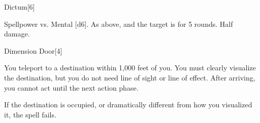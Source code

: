 \begin{spellsection}{Dictum}[6]
    \begin{spellheader}
    \end{spellheader}
    \begin{spellcontent}
        \begin{spelltargetinginfo}
        \end{spelltargetinginfo}
        \begin{spelleffects}
            \begin{spellattack}{Spellpower vs. Mental}
                \spellsuccess {}[d6].
                \spellcritical As above, and the target is \immobilized for 5 rounds.
                \spellfailure Half damage.
            \end{spellattack}
        \end{spelleffects}
    \end{spellcontent}
    \begin{spellfooter}
        \miscastexplode
    \end{spellfooter}
\end{spellsection}

\begin{spellsection}{Dimension Door}[4]
    \begin{spellheader}
    \end{spellheader}
    \begin{spellcontent}
        \begin{spelltargetinginfo}
        \end{spelltargetinginfo}
        \begin{spelleffects}
            \spelleffect You teleport to a destination within 1,000 feet of you. You must clearly visualize the destination, but you do not need line of sight or line of effect. After arriving, you cannot act until the next action phase.

            If the destination is occupied, or dramatically different from how you visualized it, the spell fails.
        \end{spelleffects}
    \end{spellcontent}
    \begin{spellfooter}
        \miscastexplode
    \end{spellfooter}
\end{spellsection}

